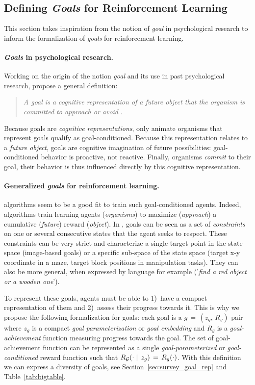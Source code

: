 \subsection{Defining \textit{Goals} for Reinforcement Learning}
\label{sec:goals}
This section takes inspiration from the notion of \textit{goal} in psychological research to inform the formalization of \textit{goals} for reinforcement learning.

\paragraph{\textit{Goals} in psychological research.} Working on the origin of the notion \textit{goal} and its use in past psychological research, \cite{elliot2008goal} propose a general definition:
\begin{quote}
    \textit{A goal is a cognitive representation of a future object that the organism is committed to approach or
    avoid} \cite{elliot2008goal}.
\end{quote}
Because goals are \textit{cognitive representations}, only animate organisms that represent goals qualify as goal-conditioned. Because this representation relates to a \textit{future object}, goals are cognitive imagination of future possibilities: goal-conditioned behavior is proactive, not reactive. Finally, organisms \textit{commit} to their goal, their behavior is thus influenced directly by this cognitive representation.

\paragraph{Generalized \textit{goals} for reinforcement learning.} \rl algorithms seem to be a good fit to train such goal-conditioned agents. Indeed, \rl algorithms train learning agents (\textit{organisms}) to maximize (\textit{approach}) a cumulative (\textit{future}) reward (\textit{object}). In \rl, goals can be seen as a set of \textit{constraints} on one or several consecutive states that the agent seeks to respect. These constraints can be very strict and characterize a single target point in the state space (\eg image-based goals) or a specific sub-space of the state space (\eg target x-y coordinate in a maze, target block positions in manipulation tasks). They can also be more general, when expressed by language for example (\eg '\textit{find a red object or a wooden one}'). 

To represent these goals, \rl agents must be able to 1)~have a compact representation of them and 2)~assess their progress towards it. This is why we propose the following formalization for \rl goals: each goal is a $g\,=\,(z_g,\,R_g)$ pair where $z_g$ is a compact \textit{goal parameterization} or \textit{goal embedding} and $R_g$ is a \textit{goal-achievement} function measuring progress towards the goal. The set of goal-achievement function can be represented as a single \textit{goal-parameterized} or \textit{goal-conditioned} reward function such that $R_{\mathcal{G}}(\cdot\mid\,z_g)\,=\,R_g(\cdot)$. With this definition we can express a diversity of goals, see Section~\ref{sec:survey_goal_rep} and Table~\ref{tab:bigtable}.

